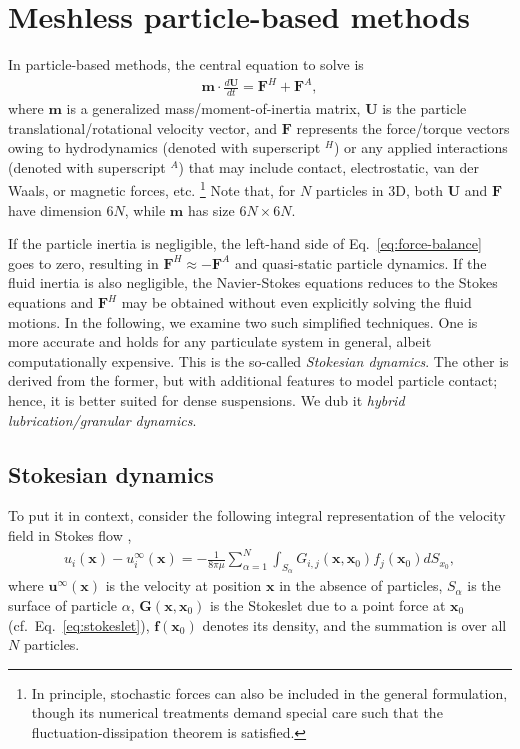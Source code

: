 \section{Meshless particle-based methods}
\label{sec:num-dem}

In particle-based methods, the central equation to solve is
\begin{equation} 
 \begin{aligned} \label{eq:force-balance}
  {\bm m} \cdot \frac{d{\bm U}}{dt} = {\bm F}^H + {\bm F}^A, 
 \end{aligned}
\end{equation}
where ${\bm m}$ is a generalized mass/moment-of-inertia matrix,
${\bm U}$ is the particle translational/rotational velocity vector,
and ${\bm F}$ represents the force/torque vectors owing to hydrodynamics (denoted with superscript $^H$)
or any applied interactions (denoted with superscript $^A$) that may include contact, electrostatic, van der Waals, or magnetic forces, etc.%
\footnote{In principle, stochastic forces can also be included in the general formulation,
though its numerical treatments demand special care such that the fluctuation-dissipation theorem is satisfied.}
Note that, for $N$ particles in 3D, both ${\bm U}$ and ${\bm F}$ have dimension $6N$, while ${\bm m}$ has size $6N \times 6N$.

If the particle inertia is negligible, the left-hand side of Eq.\ \eqref{eq:force-balance} goes to zero,
resulting in $\bm{F}^H \approx -\bm{F}^A$ and quasi-static particle dynamics.
If the fluid inertia is also negligible, the Navier-Stokes equations reduces to the Stokes equations and
$\bm{F}^H$ may be obtained without even explicitly solving the fluid motions.
In the following, we examine two such simplified techniques.
One is more accurate and holds for any particulate system in general, albeit computationally expensive. This is the so-called \emph{Stokesian dynamics}.
The other is derived from the former, but with additional features to model particle contact; hence, it is better suited for dense suspensions.
We dub it \emph{hybrid lubrication/granular dynamics}.

\subsection{Stokesian dynamics}
\label{subsec:sd}

To put it in context, consider the following integral representation of the velocity field in Stokes flow \citep{Ladyzhenskaya},
\begin{equation} \label{eq:boundary-integral}
 \begin{aligned}
  u_i(\bm{x}) - u_i^\infty(\bm{x}) = -\frac{1}{8\pi \mu} \sum_{\alpha=1}^N  \int_{S_\alpha} G_{i,j} (\bm{x},\bm{x}_0) f_j(\bm{x}_0) dS_{x_0},
 \end{aligned}
\end{equation}
where $\bm{u}^\infty(\bm{x})$ is the velocity at position $\bm{x}$ in the absence of particles,
$S_\alpha$ is the surface of particle $\alpha$,
$\bm{G}(\bm{x},\bm{x}_0)$ is the Stokeslet due to a point force at $\bm{x}_0$ (cf.\ Eq.\ \ref{eq:stokeslet}),
$\bm f(\bm{x}_0)$ denotes its density,
and the summation is over all $N$ particles.

